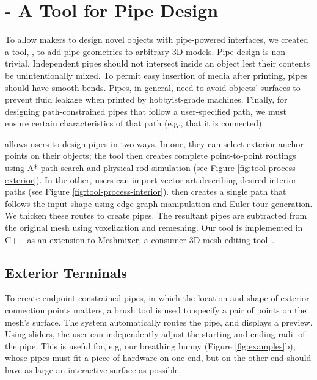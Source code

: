 \section{\systemname - A Tool for Pipe Design}
To allow makers to design novel objects with pipe-powered interfaces, we created a tool, \systemnamenospace, to add pipe geometries to arbitrary 3D models. Pipe design is non-trivial.  Independent pipes should not intersect inside an object lest their contents be unintentionally mixed.  To permit easy insertion of media after printing, pipes should have smooth bends.  Pipes, in general, need to avoid objects' surfaces to prevent fluid leakage when printed by hobbyist-grade machines.  Finally, for designing path-constrained pipes that follow a user-specified path, we must ensure certain characteristics of that path (e.g., that it is connected). 

\systemname allows users to design pipes in two ways. In one, they can select exterior anchor points on their objects; the tool then creates complete point-to-point routings using A* path search and physical rod simulation (see Figure \ref{fig:tool-process-exterior}). In the other, users can import vector art describing desired interior paths (see Figure \ref{fig:tool-process-interior}).  \systemname then creates a single path that follows the input shape using edge graph manipulation and Euler tour generation.  We thicken these routes to create pipes.  The resultant pipes are subtracted from the original mesh using voxelization and remeshing. Our tool is implemented in C++ as an extension to Meshmixer, a consumer 3D mesh editing tool~\cite{Schmidt-meshmixer}.

\subsection{Exterior Terminals}

To create endpoint-constrained pipes, in which the location and shape of exterior connection points matters, a brush tool is used to specify a pair of points on the mesh's surface. The system automatically routes the pipe, and displays a preview.  Using sliders, the user can independently adjust the starting and ending radii of the pipe.  This is useful for, e.g, our breathing bunny (Figure \ref{fig:examples}b), whose pipes must fit a piece of hardware on one end, but on the other end should have as large an interactive surface as possible.

